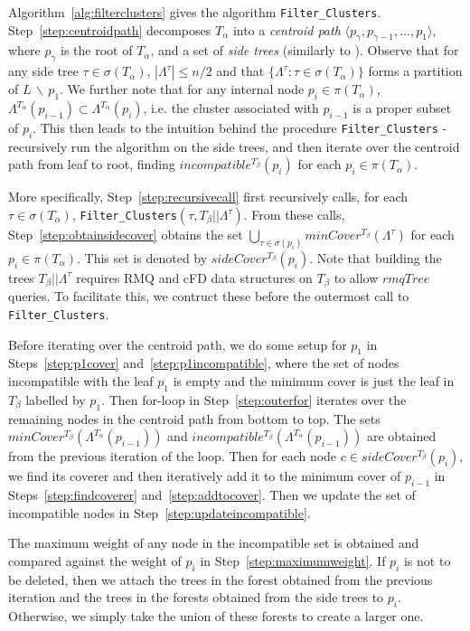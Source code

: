 \documentclass{article}
\newcommand{\leafset}{\Lambda}
\newcommand{\TA}{T_\alpha}
\newcommand{\TB}{T_\beta}
\begin{document}
    Algorithm~\ref{alg:filterclusters} gives the algorithm \texttt{Filter\_Clusters}. Step~\ref{step:centroidpath} decomposes $\TA$ into a \textit{centroid path} $\langle p_{\gamma}, p_{\gamma - 1}, \dots, p_1 \rangle$, where $p_{\gamma}$ is the root of $\TA$, and a set of \textit{side trees} (similarly to \cite{jansson2018algorithms}). Observe that for any side tree $\tau \in \sigma(\TA)$, $|\leafset^\tau| \leq n/2$ and that $\{\leafset^{\tau} : \tau \in \sigma(\TA)\}$ forms a partition of $L\, \backslash\, {p_1}$. We further note that for any internal node $p_i \in \pi(\TA)$, $\leafset^{\TA}(p_{i - 1}) \subset \leafset^{\TA}(p_i)$, i.e. the cluster associated with $p_{i-1}$ is a proper subset of $p_i$. This then leads to the intuition behind the procedure \texttt{Filter\_Clusters} - recursively run the algorithm on the side trees, and then iterate over the centroid path from leaf to root, finding $incompatible^{\TB}(p_i)$ for each $p_i \in \pi(\TA)$.

    More specifically, Step~\ref{step:recursivecall} first recursively calls, for each $\tau \in \sigma(\TA)$, \texttt{Filter\_Clusters}$(\tau, \TB||\leafset^{\tau})$. From these calls, Step~\ref{step:obtainsidecover} obtains the set $\bigcup_{\tau \in \sigma(p_i)} minCover^{\TB}(\leafset^{\tau})$ for each $p_i \in \pi(\TA)$. This set is denoted by $sideCover^{\TB}(p_i)$. Note that building the trees $\TB||\leafset^{\tau}$ requires RMQ and cFD data structures on $\TB$ to allow $rmqTree$ queries. To facilitate this, we contruct these before the outermost call to \texttt{Filter\_Clusters}.

    Before iterating over the centroid path, we do some setup for $p_1$ in Steps~\ref{step:p1cover} and~\ref{step:p1incompatible}, where the set of nodes incompatible with the leaf $p_1$ is empty and the minimum cover is just the leaf in $\TB$ labelled by $p_1$. Then for-loop in Step~\ref{step:outerfor} iterates over the remaining nodes in the centroid path from bottom to top. The sets $minCover^{\TB}(\leafset^{\TA}(p_{i-1}))$ and $incompatible^{\TB}(\leafset^{\TA}(p_{i-1}))$ are obtained from the previous iteration of the loop. Then for each node $c \in sideCover^{\TB}(p_i)$, we find its coverer and then iteratively add it to the minimum cover of $p_{i-1}$ in Steps~\ref{step:findcoverer} and~\ref{step:addtocover}. Then we update the set of incompatible nodes in Step~\ref{step:updateincompatible}.

    The maximum weight of any node in the incompatible set is obtained and compared against the weight of $p_i$ in Step~\ref{step:maximumweight}. If $p_i$ is not to be deleted, then we attach the trees in the forest obtained from the previous iteration and the trees in the forests obtained from the side trees to $p_i$. Otherwise, we simply take the union of these forests to create a larger one.
\end{document}
